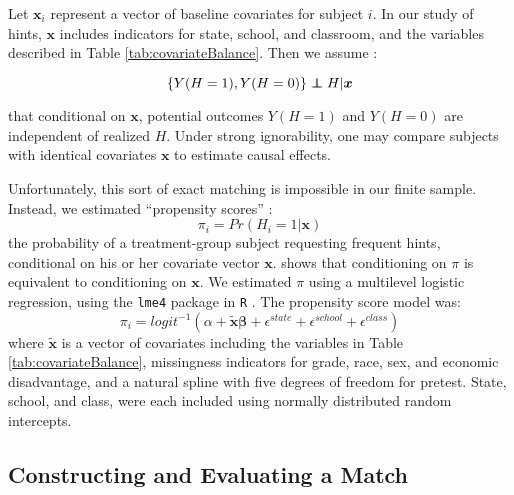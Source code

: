 \documentclass{article}\usepackage[]{graphicx}\usepackage[]{color}
\newenvironment{ass}[2][Assumption:]{\begin{trivlist}
\item[\hskip \labelsep {\bfseries #1}\hskip \labelsep {\bfseries #2}.]}{\end{trivlist}}
\def\independenT#1#2{\mathrel{\rlap{$#1#2$}\mkern2mu{#1#2}}}
\newcommand\independent{\protect\mathpalette{\protect\independenT}{\perp}}
\begin{document}
Let $\bm{x}_i$ represent a vector of baseline covariates for subject $i$.
In our study of hints, $\bm{x}$ includes indicators for state, school,
and classroom, and the variables described in Table \ref{tab:covariateBalance}.
Then we assume \citep[c.f.][]{rosenbaum1983central}:
\begin{ass}{Strong Ignorability}
\begin{equation*}
 \{Y(H=1),Y(H=0)\}\independent H |\bm{x}
\end{equation*}
\end{ass}
that conditional on $\bm{x}$, potential outcomes $Y(H=1)$ and $Y(H=0)$
are independent of realized $H$.
Under strong ignorability, one may compare subjects with identical
covariates $\bm{x}$ to estimate causal effects.

Unfortunately, this sort of exact matching is impossible in our finite
sample.
Instead, we estimated ``propensity scores'' \citep{rosenbaum1983central}:
\begin{equation*}
\pi_i=Pr(H_i=1|\bm{x})
\end{equation*}
the probability of a treatment-group subject requesting frequent hints, conditional on
his or her covariate vector $\bm{x}$.
\citet{rosenbaum1983central} shows that conditioning on $\pi$ is
equivalent to conditioning on $\bm{x}$.
We estimated $\pi$ using a multilevel logistic regression,
using the \texttt{lme4} package in
\texttt{R} \citep{lme4}.
The propensity score model was:
\begin{equation*}
\pi_i=logit^{-1}(\alpha+\bm{\tilde{x}}\bm{\beta}+\epsilon^{state}+\epsilon^{school}+\epsilon^{class})
\end{equation*}
where $\bm{\tilde{x}}$ is a vector of covariates including the
variables in Table \ref{tab:covariateBalance}, missingness
indicators for grade, race, sex, and economic disadvantage, and
a natural spline with five degrees of freedom for pretest.
State, school, and class, were each included using normally
distributed random intercepts.

\subsection{Constructing and Evaluating a Match}
\end{document}
